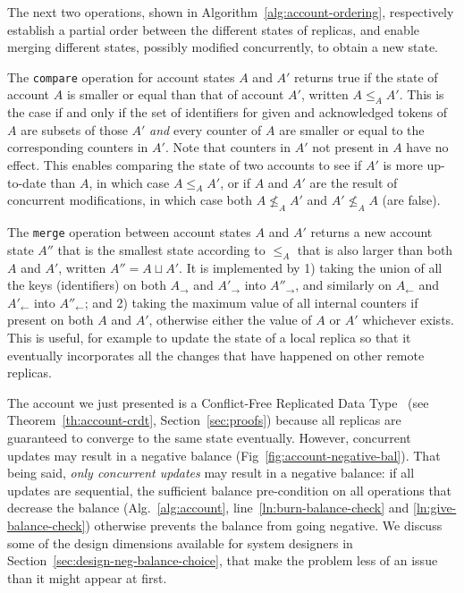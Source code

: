 \documentclass[9pt, oneside]{article}   	%
\begin{document}
The next two operations, shown in Algorithm~\ref{alg:account-ordering}, respectively establish a partial order between the different states of replicas, and enable merging different states, possibly modified concurrently, to obtain a new state.

The \texttt{compare} operation for account states $A$ and $A'$ returns true if the state of account $A$ is smaller or equal than that of account $A'$, written $A \leq_A  A'$. This is the case if and only if the set of identifiers for given and acknowledged tokens of $A$ are subsets of those $A'$ \textit{and} every counter of $A$ are smaller or equal to the corresponding counters in $A'$. Note that counters in $A'$ not present in $A$ have no effect. This enables comparing the state of two accounts to see if $A'$ is more up-to-date than $A$, in which case $A \leq_A  A'$, or if $A$ and $A'$ are the result of concurrent modifications, in which case both $A \nleq_A A'$ and $A' \nleq_A A$ (are false).

The \texttt{merge} operation between account states $A$ and $A'$ returns a new account state $A''$ that is the smallest state according to $\leq_A$ that is also larger than both $A$ and $A'$, written $A'' = A \sqcup A'$. It is implemented by 1) taking the union of all the keys (identifiers) on both $A_\rightarrow$ and $A'_\rightarrow$ into $A''_\rightarrow$, and similarly on $A_\leftarrow$ and $A'_\leftarrow$ into $A''_\leftarrow$; and 2) taking the maximum value of all internal counters if present on both $A$ and $A'$, otherwise either the value of $A$ or $A'$ whichever exists. This is useful, for example to update the state of a local replica so that it eventually incorporates all the changes that have happened on other remote replicas.


The account we just presented is a Conflict-Free Replicated Data Type~\cite{shapiro:hal-00932836} (see Theorem~\ref{th:account-crdt}, Section~\ref{sec:proofs}) because all replicas are guaranteed to converge to the same state eventually. However, concurrent updates may result in a negative balance (Fig~\ref{fig:account-negative-bal}). That being said, \textit{only concurrent updates} may result in a negative balance: if all updates are sequential, the sufficient balance pre-condition on all operations that decrease the balance (Alg.~\ref{alg:account}, line~\ref{ln:burn-balance-check} and \ref{ln:give-balance-check}) otherwise prevents the balance from going negative. We discuss some of the design dimensions available for system designers in Section~\ref{sec:design-neg-balance-choice}, that make the problem less of an issue than it might appear at first.
\end{document}
